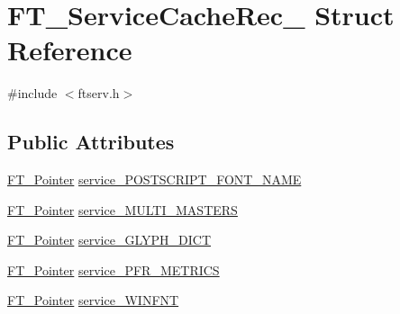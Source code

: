 \hypertarget{struct_f_t___service_cache_rec__}{\section{F\-T\-\_\-\-Service\-Cache\-Rec\-\_\- Struct Reference}
\label{struct_f_t___service_cache_rec__}
}


{\ttfamily \#include $<$ftserv.\-h$>$}

\subsection*{Public Attributes}
\begin{DoxyCompactItemize}
\item 
\hyperlink{fttypes_8h_a00f9e6a0ddd7bc55f79b2f4b5b867266}{F\-T\-\_\-\-Pointer} \hyperlink{struct_f_t___service_cache_rec___a1b95ee574621c8b031fe239d449bfa5c}{service\-\_\-\-P\-O\-S\-T\-S\-C\-R\-I\-P\-T\-\_\-\-F\-O\-N\-T\-\_\-\-N\-A\-M\-E}
\item 
\hyperlink{fttypes_8h_a00f9e6a0ddd7bc55f79b2f4b5b867266}{F\-T\-\_\-\-Pointer} \hyperlink{struct_f_t___service_cache_rec___abf51ac75b59eeac29ad5e4bbbc50e749}{service\-\_\-\-M\-U\-L\-T\-I\-\_\-\-M\-A\-S\-T\-E\-R\-S}
\item 
\hyperlink{fttypes_8h_a00f9e6a0ddd7bc55f79b2f4b5b867266}{F\-T\-\_\-\-Pointer} \hyperlink{struct_f_t___service_cache_rec___af8bbf442f497ad21666069ec33aaa88a}{service\-\_\-\-G\-L\-Y\-P\-H\-\_\-\-D\-I\-C\-T}
\item 
\hyperlink{fttypes_8h_a00f9e6a0ddd7bc55f79b2f4b5b867266}{F\-T\-\_\-\-Pointer} \hyperlink{struct_f_t___service_cache_rec___ac5d029d7f442e8b727c40d5a88faa344}{service\-\_\-\-P\-F\-R\-\_\-\-M\-E\-T\-R\-I\-C\-S}
\item 
\hyperlink{fttypes_8h_a00f9e6a0ddd7bc55f79b2f4b5b867266}{F\-T\-\_\-\-Pointer} \hyperlink{struct_f_t___service_cache_rec___abb824452cfb20932fbd22405323781f9}{service\-\_\-\-W\-I\-N\-F\-N\-T}
\end{DoxyCompactItemize}


